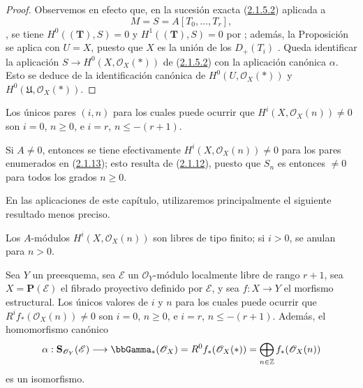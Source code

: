 \begin{proof}
Observemos en efecto que, en la sucesión exacta
(\hyperref[III.2.1.5.2-fr]{2.1.5.2}) aplicada a
\[
M=S=A[T_0,\ldots,T_r],
\],
se tiene
$H^0((\mathbf T),S)=0$ y $H^1((\mathbf T),S)=0$ por ; además, la Proposición~ se aplica con $U=X$, puesto que $X$ es la unión de los $D_+(T_i)$ .
Queda identificar la aplicación $S\to H^0(X,\mathcal O_X(*))$ de (\hyperref[III.2.1.5.2]{2.1.5.2}) con la aplicación canónica $\alpha$.
Esto se deduce de la identificación canónica de $H^0(U,\mathcal O_X(*))$ y $H^0(\mathfrak U,\mathcal O_X(*))$.
\end{proof}

\begin{corollary}[2.1.13]
\label{III.2.1.13}
\label{III.2.1.13-fr}
Los únicos pares $(i,n)$ para los cuales puede ocurrir que $H^i(X,\mathcal O_X(n))\neq0$ son $i=0$, $n\geq0$, e $i=r$, $n\leq-(r+1)$.
\end{corollary}

Si $A\neq0$, entonces se tiene efectivamente $H^i(X,\mathcal O_X(n))\neq0$ para los pares enumerados en
(\hyperref[III.2.1.13-fr]{2.1.13}); esto resulta de
(\hyperref[III.2.1.12-fr]{2.1.12}), puesto que $S_n$ es entonces $\neq0$ para
todos los grados $n\geq0$.

En las aplicaciones de este capítulo, utilizaremos principalmente el siguiente resultado menos preciso.

\begin{corollary}[2.1.14]
\label{III.2.1.14}
\label{III.2.1.14-fr}
Los $A$-módulos $H^i(X,\mathcal O_X(n))$ son libres de tipo finito; si $i>0$, se anulan para $n>0$.
\end{corollary}

\begin{proposition}[2.1.15]
\label{III.2.1.15}
\label{III.2.1.15-fr}
Sea $Y$ un preesquema, sea $\mathcal E$ un $\mathcal O_Y$-módulo localmente libre de rango $r+1$, sea $X=\mathbf P(\mathcal E)$ el fibrado proyectivo definido por $\mathcal E$, y sea $f:X\to Y$ el morfismo estructural.
Los únicos valores de $i$ y $n$ para los cuales puede ocurrir que $R^if_*(\mathcal O_X(n))\neq0$ son $i=0$, $n\geq0$, e $i=r$, $n\leq-(r+1)$.
Además, el homomorfismo canónico 
\[
\alpha:\mathbf S_{\mathcal O_Y}(\mathcal E)
\longrightarrow\bbGamma_*(\mathcal O_X)
=R^0f_*(\mathcal O_X(*))
=\bigoplus_{n\in\mathbb Z}f_*(\mathcal O_X(n))
\]
es un isomorfismo.
\end{proposition}


